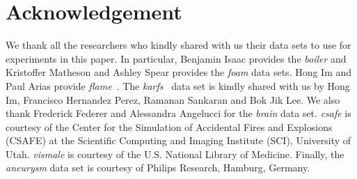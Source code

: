 \documentclass{article}
\begin{document}
\section{Acknowledgement}
We thank all the researchers who kindly shared with us their data sets to use for experiments in
this paper. In particular, Benjamin Isaac provides the \emph{boiler} and Kristoffer Matheson and
Ashley Spear provides the \emph{foam} data sets. Hong Im and Paul Arias provide
\emph{flame}~\cite{paul_arias}. The \emph{karfs}~\cite{HERNANDEZPEREZ2018} data set is kindly shared
with us by Hong Im, Francisco Hernandez Perez, Ramanan Sankaran and Bok Jik Lee. We also thank
Frederick Federer and Alessandra Angelucci for the \emph{brain} data set. \emph{csafe} is courtesy
of the Center for the Simulation of Accidental Fires and Explosions (CSAFE) at the Scientific
Computing and Imaging Institute (SCI), University of Utah.
\emph{vismale} is courtesy of the U.S. National Library of Medicine. Finally, the \emph{aneurysm}
data set is courtesy of Philips Research, Hamburg, Germany.

%
%
%

\end{document}

